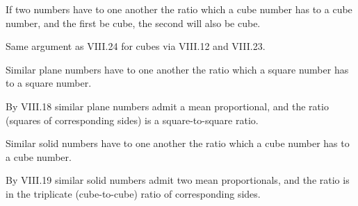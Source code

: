 \begin{claim}
\label{prop:VIII.25}
If two numbers have to one another the ratio which a cube number has
to a cube number, and the first be cube, the second will also be
cube.
\end{claim}
\begin{evidence}
\label{ev:VIII.25}
Same argument as VIII.24 for cubes via VIII.12 and VIII.23.
\end{evidence}

\begin{claim}
\label{prop:VIII.26}
Similar plane numbers have to one another the ratio which a square
number has to a square number.
\end{claim}
\begin{evidence}
\label{ev:VIII.26}
By VIII.18 similar plane numbers admit a mean proportional, and the
ratio (squares of corresponding sides) is a square-to-square ratio.
\end{evidence}

\begin{claim}
\label{prop:VIII.27}
Similar solid numbers have to one another the ratio which a cube
number has to a cube number.
\end{claim}
\begin{evidence}
\label{ev:VIII.27}
By VIII.19 similar solid numbers admit two mean proportionals, and
the ratio is in the triplicate (cube-to-cube) ratio of corresponding
sides.
\end{evidence}
